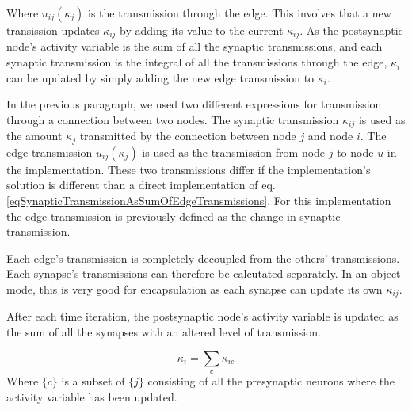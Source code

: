 			Where $u_{ij}(\kappa_j)$ is the transmission through the edge.
			This involves that a new transission updates $\kappa_{ij}$ by adding its value to the current $\kappa_{ij}$.
			As the postsynaptic node's activity variable is the sum of all the synaptic transmissions, and each synaptic transmission is the integral of all the transmissions through the edge, 
				$\kappa_i$ can be updated by simply adding the new edge transmission to $\kappa_i$.

			In the previous paragraph, we used two 		 different expressions for transmission through a connection between two nodes. 
			The synaptic transmission $\kappa_{ij}$ is used as the amount $\kappa_j$ transmitted by the connection between node $j$ and node $i$. 
			The edge transmission $u_{ij}(\kappa_j)$ is used as the transmission from node $j$ to node $u$ in the implementation. 
			These two transmissions differ if the implementation's solution is different than a direct implementation of eq. \eqref{eqSynapticTransmissionAsSumOfEdgeTransmissions}.
			For this implementation the edge transmission is previously defined as the change in synaptic transmission. 


			Each edge's transmission is completely decoupled from the others' transmissions.
			Each synapse's transmissions can therefore be calcutated separately.
			In an object mode, this is very good for encapsulation as each synapse can update its own $\kappa_{ij}$.

			After each time iteration, the postsynaptic node's activity variable is updated as the sum of all the synapses with an altered level of transmission.

			\begin{equation}
				\kappa_i = \sum_c{\kappa_{ic}}
				\label{eqSynapticTransmissionForKANNimplementation}
			\end{equation}
			Where $\{c\}$ is a subset of $\{j\}$ consisting of all the presynaptic neurons where the activity variable has been updated.

